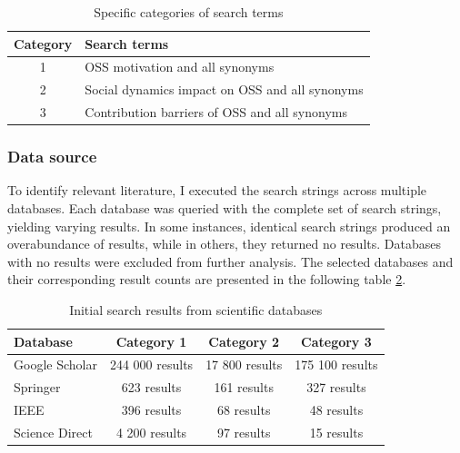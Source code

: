 \begin{table}[ht]
    \centering
    \begin{tabular}{ | c | l | }
        \hline
        Category & Search terms                                   \\ \hline
        1        & OSS motivation and all synonyms                \\ \hline
        2        & Social dynamics impact on OSS and all synonyms \\  \hline
        3        & Contribution barriers of OSS and all synonyms  \\  \hline
    \end{tabular}
    \caption{Specific categories of search terms}
    \label{tab:categoriesSearchTerms}
\end{table}



\subsubsection{Data source}

To identify relevant literature, I executed the search strings across multiple databases. Each database was queried with the complete set of search strings, yielding varying results. In some instances, identical search strings produced an overabundance of results, while in others, they returned no results. Databases with no results were excluded from further analysis. The selected databases and their corresponding result counts are presented in the following table \ref{tab:initialSearch}.


\begin{table}[ht]
    \centering
    \begin{tabular}{ | l | c | c | c |}
        \hline
        Database       & Category 1      & Category 2     & Category 3      \\ \hline
        Google Scholar & 244 000 results & 17 800 results & 175 100 results \\ \hline
        Springer       & 623 results     & 161 results    & 327 results     \\ \hline
        IEEE           & 396 results     & 68 results     & 48 results      \\ \hline
        Science Direct & 4 200 results   & 97 results     & 15 results      \\ \hline
    \end{tabular}
    \caption{Initial search results from scientific databases}
    \label{tab:initialSearch}
\end{table}



